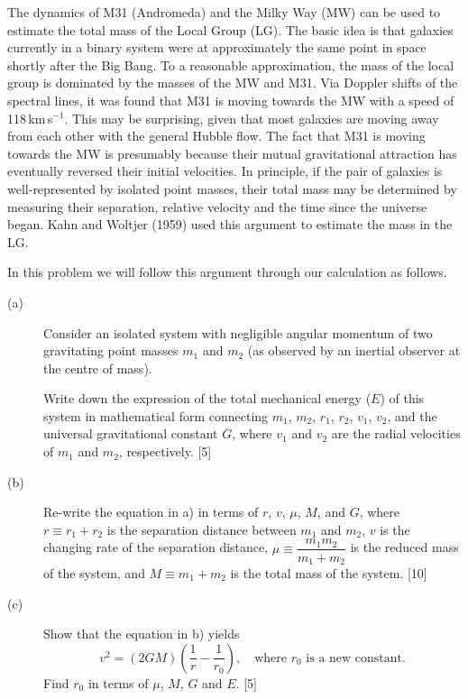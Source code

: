 The dynamics of M31 (Andromeda) and the Milky Way (MW) can be used to estimate
the total mass of the Local Group (LG). The basic idea is that galaxies
currently in a binary system were at approximately the same point in space
shortly after the Big Bang. To a reasonable approximation, the mass of the
local group is dominated by the masses of the MW and M31. Via Doppler shifts
of the spectral lines, it was found that M31 is moving towards the MW with a
speed of 118\,km\,s$^{-1}$. This may be surprising, given that most galaxies
are moving away from each other with the general Hubble flow. The fact that
M31 is moving towards the MW is presumably because their mutual gravitational
attraction has eventually reversed their initial velocities. In principle, if
the pair of galaxies is well-represented by isolated point masses, their total
mass may be determined by measuring their separation, relative velocity and
the time since the universe began. Kahn and Woltjer (1959) used this argument
to estimate the mass in the LG.

In this problem we will follow this argument through our calculation as
follows.

\begin{description}
\item[(a)] Consider an isolated system with negligible angular momentum of two
  gravitating point masses $m_1$ and $m_2$ (as observed by an inertial
  observer at the centre of mass).


  Write down the expression of the total mechanical energy ($E$) of this
  system in mathematical form connecting $m_1$, $m_2$, $r_1$, $r_2$, $v_1$,
  $v_2$, and the universal gravitational constant $G$, where $v_1$ and $v_2$
  are the radial velocities of $m_1$ and $m_2$, respectively. \hfill[5]
\item[(b)] Re-write the equation in a) in terms of $r$, $v$, $\mu$, $M$, and
  $G$, where $r \equiv r_1 + r_2$ is the separation distance between $m_1$ and
  $m_2$, $v$ is the changing rate of the separation distance,
  $\mu \equiv \dfrac{m_1 m_2}{m_1 + m_2}$ is the reduced mass of the system,
  and $M \equiv m_1 + m_2$ is the total mass of the system. \hfill[10]
\item[(c)] Show that the equation in b) yields
  \[ v^2 = (2GM)\left(\frac{1}{r} - \frac{1}{r_0}\right),
     \quad\text{where } r_0 \text{ is a new constant.} \]
  Find $r_0$ in terms of $\mu$, $M$, $G$ and $E$. \hfill[5]
\end{description}

